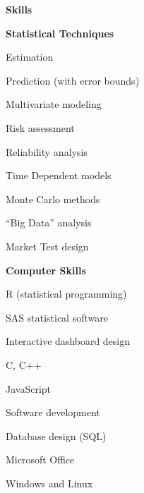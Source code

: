 \documentclass[letterpaper,12pt,final]{memoir}
\newcommand{\MedSep}{\vspace{1em}}
\newcommand{\SmallSep}{\vspace{0.5em}}
\newcommand{\CVSection}[1]
	{\Large\textbf{#1}\par
	\SmallSep\normalsize\normalfont}
\newcommand{\CVItem}[1]
	{\textbf{\color{RoyalBlue} #1}}
\begin{document}
\CVSection{Skills}
\CVItem{Statistical Techniques}
\begin{multicols}{3}
\begin{compactitem}[\color{RoyalBlue}$\bullet$]
	\item Estimation 
	\item Prediction (with error bounds)
	\item Multivariate modeling
	\item Risk assessment 
	\item Reliability analysis
	\item Time Dependent models
	\item Monte Carlo methods
	\item ``Big Data'' analysis
	\item Market Test design
\end{compactitem}
\end{multicols}
\SmallSep
\CVItem{Computer Skills}
\begin{multicols}{3}
\begin{compactitem}[\color{RoyalBlue}$\bullet$]
	\item R (statistical programming)
  \item SAS statistical software
	\item Interactive dashboard design
	\item C, C++
	\item JavaScript
	\item Software development
	\item Database design (SQL)
  \item Microsoft Office
  \item Windows and Linux
\end{compactitem}
\end{multicols}
\MedSep 
\end{document}
